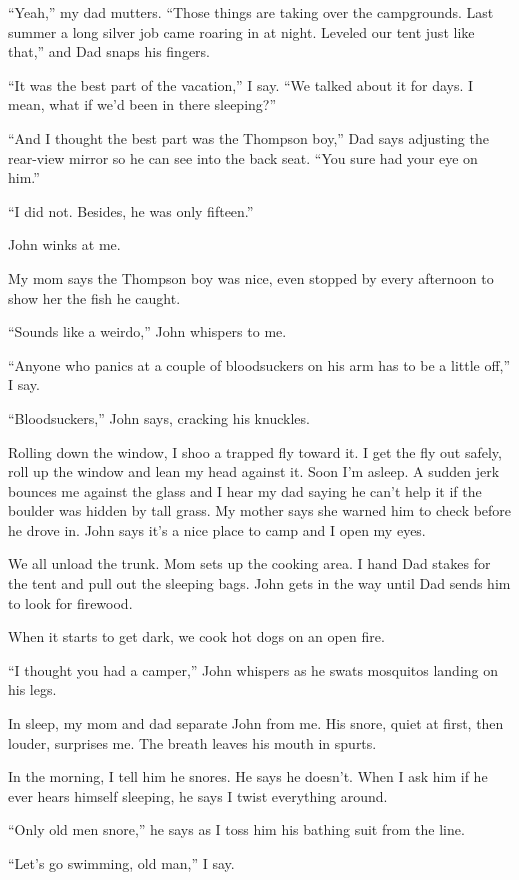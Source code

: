 \documentclass[twoside,10pt]{book}
\begin{document}
``Yeah,'' my dad mutters. ``Those things are taking over the
campgrounds. Last summer a long silver job came roaring in at night.
Leveled our tent just like that,'' and Dad snaps his fingers.

``It was the best part of the vacation,'' I say. ``We talked about it
for days. I mean, what if we'd been in there sleeping?''

``And I thought the best part was the Thompson boy,'' Dad says adjusting
the rear-view mirror so he can see into the back seat. ``You sure had
your eye on him.''

``I did not. Besides, he was only fifteen.''

John winks at me.

My mom says the Thompson boy was nice, even stopped by every afternoon
to show her the fish he caught.

``Sounds like a weirdo,'' John whispers to me.

``Anyone who panics at a couple of bloodsuckers on his arm has to be a
little off,'' I say.

``Bloodsuckers,'' John says, cracking his knuckles.

Rolling down the window, I shoo a trapped fly toward it. I get the fly
out safely, roll up the win­dow and lean my head against it. Soon I'm
asleep. A sudden jerk bounces me against the glass and I hear my dad
saying he can't help it if the boulder was hidden by tall grass. My
mother says she warned him to check before he drove in. John says it's a
nice place to camp and I open my eyes.

We all unload the trunk. Mom sets up the cooking area. I hand Dad stakes
for the tent and pull out the sleeping bags. John gets in the way until
Dad sends him to look for firewood.

When it starts to get dark, we cook hot dogs on an open fire.

``I thought you had a camper,'' John whispers as he swats mosquitos
landing on his legs.

In sleep, my mom and dad separate John from me. His snore, quiet at
first, then louder, surprises me. The breath leaves his mouth in spurts.

In the morning, I tell him he snores. He says he doesn't. When I ask him
if he ever hears himself sleeping, he says I twist everything around.

``Only old men snore,'' he says as I toss him his bathing suit from the
line.

``Let's go swimming, old man,'' I say.
\end{document}
